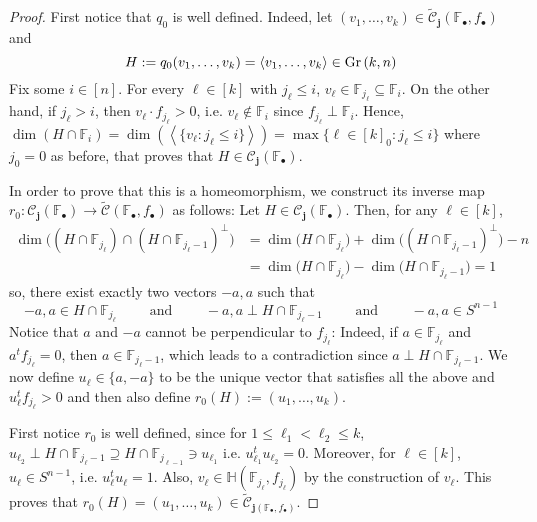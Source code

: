 \begin{proof} First notice that $q_0$ is well defined. Indeed, let $(v_1,\ldots,v_k)\in\tilde{\mathcal{C}}_{\mathbf{j}}(\mathbb{F}_{\bullet},f_{\bullet})$ and
\[H:=q_0(v_1,\ldots,v_k)=\left<v_1,\ldots,v_k\right>\in\Gr{k}{n}\]
Fix some $i\in[n]$. For every $\ell\in[k]$ with $j_{\ell}\leq i$,  $v_{\ell}\in\mathbb{F}_{j_{\ell}}\subseteq\mathbb{F}_i$. On the other hand, if $j_{\ell}>i$, then $v_{\ell}\cdot f_{j_{\ell}}>0$, i.e. $v_{\ell}\not\in\mathbb{F}_i$ since $f_{j_{\ell}}\perp\mathbb{F}_i$. Hence,
$\dim(H\cap\mathbb{F}_i)=\dim\left(\left<\big\{v_{\ell}:j_{\ell}\leq i\big\}\right>\right)=\max\{\ell\in[k]_0:j_{\ell}\leq i\}$
where $j_0=0$ as before, that proves that $H\in\mathcal{C}_{\mathbf{j}}(\mathbb{F}_{\bullet})$.

In order to prove that this is a homeomorphism, we construct its inverse map $r_0:\mathcal{C}_{\mathbf{j}}(\mathbb{F}_{\bullet})\to\tilde{\mathcal{C}}(\mathbb{F}_{\bullet},f_{\bullet})$ as follows: Let $H\in\mathcal{C}_{\mathbf{j}}(\mathbb{F}_{\bullet})$. Then, for any $\ell\in[k]$,
\begin{align*}
\dim\big(\left(H\cap\mathbb{F}_{j_{\ell}}\right)\cap\left(H\cap\mathbb{F}_{j_{\ell}-1}\right)^{\perp}\big)&=\dim\big(H\cap\mathbb{F}_{j_{\ell}}\big)+\dim\big(\left(H\cap\mathbb{F}_{j_{\ell}-1}\right)^{\perp}\big)-n\\
&=\dim\big(H\cap\mathbb{F}_{j_{\ell}}\big)-\dim\big(H\cap\mathbb{F}_{j_{\ell}-1}\big)=1
\end{align*}
so, there exist exactly two vectors $-a,a$ such that
\[-a,a\in H\cap\mathbb{F}_{j_{\ell}}\qquad\text{ and }\qquad-a,a\perp H\cap\mathbb{F}_{j_{\ell}-1}\qquad\text{ and }\qquad-a,a\in S^{n-1}\]
Notice that $a$ and $-a$ cannot be perpendicular to $f_{j_{\ell}}$: Indeed, if $a\in\mathbb{F}_{j_{\ell}}$ and $a^tf_{j_{\ell}}=0$, then $a\in\mathbb{F}_{j_{\ell}-1}$, which leads to a contradiction since $a\perp H\cap\mathbb{F}_{j_{\ell}-1}$. We now define $u_{\ell}\in\{a,-a\}$ to be the unique vector that satisfies all the above and $u_{\ell}^tf_{j_{\ell}}>0$ and then also define $r_0(H):=(u_1,\ldots,u_k)$.

First notice $r_0$ is well defined, since for $1\leq\ell_1<\ell_2\leq k$,
$u_{\ell_2}\perp H\cap\mathbb{F}_{j_{\ell}-1}\supseteq H\cap\mathbb{F}_{j_{\ell-1}}\ni u_{\ell_1}$
i.e. $u_{\ell_1}^tu_{\ell_2}=0$. Moreover, for $\ell\in[k]$, $u_{\ell}\in S^{n-1}$, i.e. $u_{\ell}^tu_{\ell}=1$. Also, $v_{\ell}\in\mathbb{H}(\mathbb{F}_{j_{\ell}},f_{j_{\ell}})$ by the construction of $v_{\ell}$. This proves that $r_0(H)=(u_1,\ldots,u_k)\in\tilde{\mathcal{C}}_{\mathbf{j}(\mathbb{F}_{\bullet},f_{\bullet})}$.


\end{proof}
